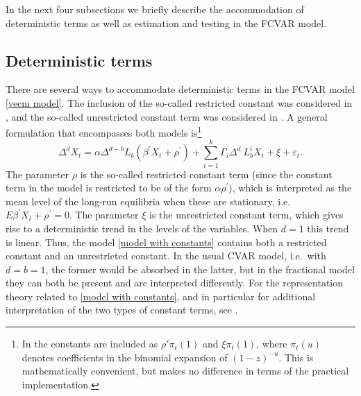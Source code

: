 \documentclass[10pt]{article}
\begin{document}
In the next four subsections we briefly describe the accommodation of deterministic terms as well as estimation and testing in the FCVAR model.


\subsection{Deterministic terms}

There are several ways to accommodate deterministic terms in the FCVAR model \eqref{vecm model}. The inclusion of the so-called restricted constant was considered in \cite{johansen2012likelihood}, and the so-called unrestricted constant term was considered in \cite{Dolatabadi2014}. A general formulation that encompasses both models is\footnote{In \cite{Dolatabadi2014} the constants are included as $\rho' \pi_t(1)$ and $\xi \pi_t(1)$, where $\pi_t(u)$ denotes coefficients in the binomial expansion of $(1-z)^{-u}$. This is mathematically convenient, but makes no difference in terms of the practical implementation.}
\begin{equation}
\Delta^{d}X_{t}= \alpha \Delta^{d-b} L_{b} (\beta^{\prime} X_{t} +\rho^{\prime}) + 
\sum_{i=1}^{k}\Gamma_{i}\Delta^{d}\ L_{b}^{i}X_{t} +\xi
+ \varepsilon_{t}.
\label{model with constants}
\end{equation}
The parameter $\rho $ is the so-called restricted constant term (since the constant term in the model is restricted to be of the form $\alpha \rho ^{\prime }$), which is interpreted as the mean level of the long-run equilibria when these are stationary, i.e.\ $E\beta ^{\prime }X_{t}+\rho ^{\prime }=0$. The parameter $\xi$ is the unrestricted constant term, which gives rise to a deterministic trend in the levels of the variables. When $d=1$ this trend is linear. Thus, the model \eqref{model with constants} contains both a restricted constant and an unrestricted constant. In the usual CVAR model, i.e.\ with $d=b=1$, the former would be absorbed in the latter, but in the fractional model they can both be present and are interpreted differently. For the representation theory related to \eqref{model with constants}, and in particular for additional interpretation of the two types of constant terms, see \cite{Dolatabadi2014}.
\end{document}
